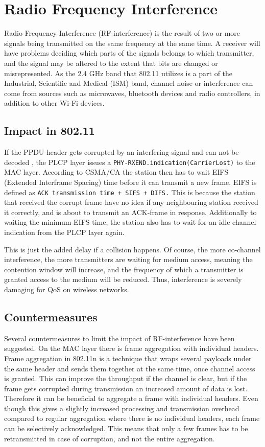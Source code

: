 	\section{Radio Frequency Interference}
	Radio Frequency Interference (RF-interference) is the result
	of two or more signals being transmitted on the same frequency at the same time.
	A receiver will have problems deciding which parts of the signals 
	belongs to which transmitter, and the signal may be altered to the extent
	that bits are changed or misrepresented. As the 2.4 GHz band that 802.11
	utilizes is a part of the Industrial, Scientific and Medical (ISM) band, channel noise or interference
	can come from sources such as microwaves, bluetooth devices and radio controllers, in addition to other Wi-Fi devices. 

	\subsection{Impact in 802.11}
	If the PPDU header
	gets corrupted by an interfering signal and can not be decoded
	, the PLCP layer issues a \verb|PHY-RXEND.indication(CarrierLost)|
	to the MAC layer. According to CSMA/CA the station then has to
	wait EIFS (Extended Interframe Spacing) time before
	it can transmit a new frame. EIFS is defined as
	\verb|ACK transmission time + SIFS + DIFS.| This is because the station that received the corrupt frame have no idea if any neighbouring station
	received it correctly, and is about to transmit an ACK-frame in response. Additionally
	to waiting the minimum EIFS time, the station also has to wait for
	an idle channel indication from the PLCP layer again. 

	This is just the added delay if a collision happens. Of course, the more co-channel interference, the more transmitters are waiting for medium access, meaning
	the contention window will increase, and the frequency of which a transmitter is granted access to the medium will be reduced. Thus, interference is severely damaging for QoS on wireless networks.   %

	\subsection{Countermeasures}
	Several countermeasures to limit the impact of RF-interference have been suggested.
	On the MAC layer there is frame aggregation with individual headers.
	Frame aggregation in 802.11n is a technique that wraps several payloads under the same
	header and sends them together at the same time, once channel access is granted. This can improve the throughput
	if the channel is clear, but if the frame gets corrupted during transmission
	an increased amount of data is lost.
	Therefore it can be beneficial to aggregate a frame with individual headers.
	Even though this gives a slightly increased processing and transmission overhead
	compared to regular aggregation where there is no individual headers, 
	each frame can be selectively acknowledged.
	This means that only a few frames has to be retransmitted in case of corruption,
	and not the entire aggregation. 

